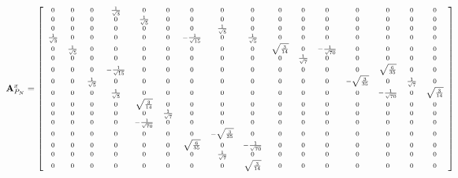 $$
\scriptsize
\hspace*{-2cm}
\mat{A}_{P_N}^x =
\left[
\begin{array}{cccccccccccccccc}
 0 & 0 & 0 & \frac{1}{\sqrt{3}} & 0 & 0 & 0 & 0 & 0 & 0 & 0 & 0 & 0 & 0 & 0 & 0 \\
 0 & 0 & 0 & 0 & \frac{1}{\sqrt{5}} & 0 & 0 & 0 & 0 & 0 & 0 & 0 & 0 & 0 & 0 & 0 \\
 0 & 0 & 0 & 0 & 0 & 0 & 0 & \frac{1}{\sqrt{5}} & 0 & 0 & 0 & 0 & 0 & 0 & 0 & 0 \\
 \frac{1}{\sqrt{3}} & 0 & 0 & 0 & 0 & 0 & -\frac{1}{\sqrt{15}} & 0 & \frac{1}{\sqrt{5}} & 0 & 0 & 0 & 0 & 0 & 0 & 0 \\
 0 & \frac{1}{\sqrt{5}} & 0 & 0 & 0 & 0 & 0 & 0 & 0 & \sqrt{\frac{3}{14}} & 0 & -\frac{1}{\sqrt{70}} & 0 & 0 & 0 & 0 \\
 0 & 0 & 0 & 0 & 0 & 0 & 0 & 0 & 0 & 0 & \frac{1}{\sqrt{7}} & 0 & 0 & 0 & 0 & 0 \\
 0 & 0 & 0 & -\frac{1}{\sqrt{15}} & 0 & 0 & 0 & 0 & 0 & 0 & 0 & 0 & 0 & \sqrt{\frac{6}{35}} & 0 & 0 \\
 0 & 0 & \frac{1}{\sqrt{5}} & 0 & 0 & 0 & 0 & 0 & 0 & 0 & 0 & 0 & -\sqrt{\frac{3}{35}} & 0 & \frac{1}{\sqrt{7}} & 0 \\
 0 & 0 & 0 & \frac{1}{\sqrt{5}} & 0 & 0 & 0 & 0 & 0 & 0 & 0 & 0 & 0 & -\frac{1}{\sqrt{70}} & 0 & \sqrt{\frac{3}{14}} \\
 0 & 0 & 0 & 0 & \sqrt{\frac{3}{14}} & 0 & 0 & 0 & 0 & 0 & 0 & 0 & 0 & 0 & 0 & 0 \\
 0 & 0 & 0 & 0 & 0 & \frac{1}{\sqrt{7}} & 0 & 0 & 0 & 0 & 0 & 0 & 0 & 0 & 0 & 0 \\
 0 & 0 & 0 & 0 & -\frac{1}{\sqrt{70}} & 0 & 0 & 0 & 0 & 0 & 0 & 0 & 0 & 0 & 0 & 0 \\
 0 & 0 & 0 & 0 & 0 & 0 & 0 & -\sqrt{\frac{3}{35}} & 0 & 0 & 0 & 0 & 0 & 0 & 0 & 0 \\
 0 & 0 & 0 & 0 & 0 & 0 & \sqrt{\frac{6}{35}} & 0 & -\frac{1}{\sqrt{70}} & 0 & 0 & 0 & 0 & 0 & 0 & 0 \\
 0 & 0 & 0 & 0 & 0 & 0 & 0 & \frac{1}{\sqrt{7}} & 0 & 0 & 0 & 0 & 0 & 0 & 0 & 0 \\
 0 & 0 & 0 & 0 & 0 & 0 & 0 & 0 & \sqrt{\frac{3}{14}} & 0 & 0 & 0 & 0 & 0 & 0 & 0 \\
\end{array}
\right]
$$


